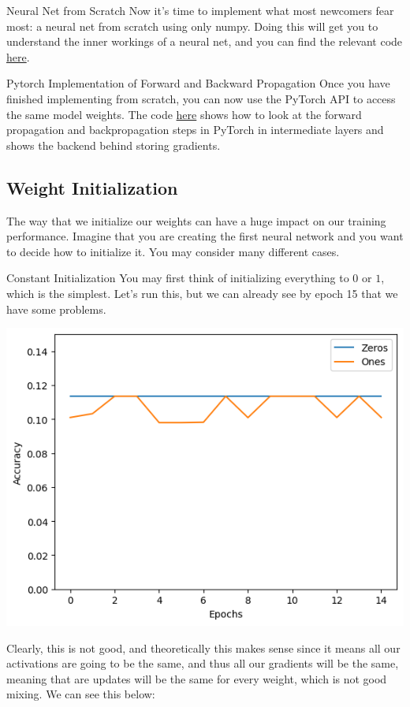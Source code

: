 \documentclass{article}
\begin{document}
    \begin{code}{Neural Net from Scratch}
      Now it's time to implement what most newcomers fear most: a neural net from scratch using only numpy. Doing this will get you to understand the inner workings of a neural net, and you can find the relevant code \href{code/mlp_from_scratch.ipynb}{here}.  
    \end{code} 

    \begin{code}{Pytorch Implementation of Forward and Backward Propagation}
      Once you have finished implementing from scratch, you can now use the PyTorch API to access the same model weights. The code \href{code/forward_backward.ipynb}{here} shows how to look at the forward propagation and backpropagation steps in PyTorch in intermediate layers and shows the backend behind storing gradients. 
    \end{code}

  \subsection{Weight Initialization}

    The way that we initialize our weights can have a huge impact on our training performance. Imagine that you are creating the first neural network and you want to decide how to initialize it. You may consider many different cases. 

    \begin{example}{Constant Initialization}
      You may first think of initializing everything to $0$ or $1$, which is the simplest. Let's run this, but we can already see by epoch 15 that we have some problems. 
      \begin{center}
        \includegraphics[scale=0.5]{img/01_MLP/first_initialize.png}
      \end{center}
      Clearly, this is not good, and theoretically this makes sense since it means all our activations are going to be the same, and thus all our gradients will be the same, meaning that are updates will be the same for every weight, which is not good mixing. We can see this below: 
    \end{example}
\end{document}
